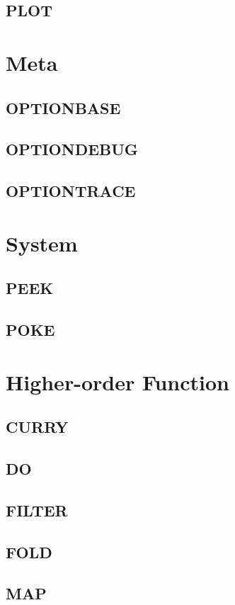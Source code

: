     \subsection{PLOT}

\section{Meta}

    \subsection{OPTIONBASE}
    \subsection{OPTIONDEBUG}
    \subsection{OPTIONTRACE}

\section{System}

    \subsection{PEEK}
    \subsection{POKE}

\section{Higher-order Function}

    \subsection{CURRY}
    \subsection{DO}
    \subsection{FILTER}
    \subsection{FOLD}
    \subsection{MAP}
